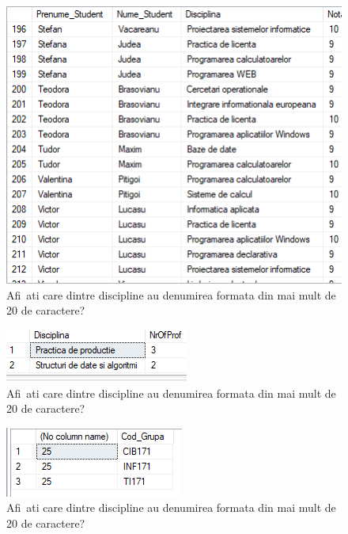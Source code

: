 \documentclass[12pt]{article}
\begin{document}
        \begin{figure}[H]
                \centering
                \includegraphics[width=.95\textwidth]{img14.png}
                \caption{Afi~ati care dintre discipline au denumirea formata din mai mult de 20 de caractere? }
        \end{figure}
        \vspace{0.5 cm}

        \begin{figure}[H]
                \centering
                \includegraphics[width=.95\textwidth]{img24.png}
                \caption{Afi~ati care dintre discipline au denumirea formata din mai mult de 20 de caractere? }
        \end{figure}
        \vspace{0.5 cm}

        \begin{figure}[H]
                \centering
                \includegraphics[width=.95\textwidth]{img25.png}
                \caption{Afi~ati care dintre discipline au denumirea formata din mai mult de 20 de caractere? }
        \end{figure}
        \vspace{0.5 cm}
\end{document}
